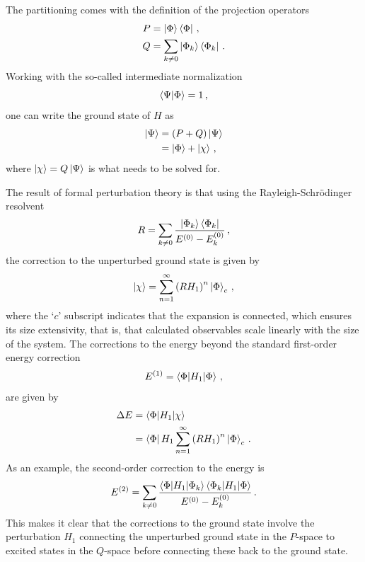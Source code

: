 The partitioning comes with the definition of the projection operators
\begin{align}
  P & = \ket{\Phi}\bra{\Phi}\,,                   \\
  Q & = \sum_{k\neq 0}\ket{\Phi_k}\bra{\Phi_k}\,.
\end{align}
Working with the so-called intermediate normalization
\begin{equation}
  \braket{\Psi|\Phi} = 1\,,
\end{equation}
one can write the ground state of $H$ as
\begin{align}
  \ket{\Psi} & = (P + Q)\ket{\Psi}       \\
             & = \ket{\Phi} + \ket{\chi}\,,
\end{align}
where $\ket{\chi} = Q \ket{\Psi}$ is what needs to be solved for.

The result of formal perturbation theory is that
using the Rayleigh-Schr\"{o}dinger resolvent
\begin{equation}
  R = \sum_{k\neq 0} \frac{\ket{\Phi_k}\bra{\Phi_k}}{E^{(0)} - E^{(0)}_{k}} \,,
\end{equation}
the correction to the unperturbed ground state is given by
\begin{equation}
  \ket{\chi} = \sum_{n=1}^{\infty}{(R H_1)}^n \ket{\Phi}_c\,,
\end{equation}
where the `$c$' subscript indicates that the expansion is connected,
which ensures its size extensivity,
that is, that calculated observables scale linearly with the size of the system.
The corrections to the energy beyond the standard first-order energy correction
\begin{equation}
  E^{(1)} = \braket{\Phi | H_1 | \Phi}\,,
\end{equation}
are given by
\begin{align}
  \Delta E & = \braket{\Phi | H_1 | \chi}                                  \\
           & = \bra{\Phi}  H_1 \sum_{n=1}^{\infty}{(R H_1)}^n \ket{\Phi}_c\,.
\end{align}
As an example, the second-order correction to the energy is
\begin{equation}
  E^{(2)} = \sum_{k\neq 0} \frac{\braket{\Phi | H_1 | \Phi_k}\braket{\Phi_k | H_1 | \Phi}}
  {E^{(0)} - E^{(0)}_k}\,.
\end{equation}
This makes it clear that the corrections to the ground state involve
the perturbation $H_1$ connecting the unperturbed ground state in the $P$-space
to excited states in the $Q$-space before connecting these back to the ground state.

